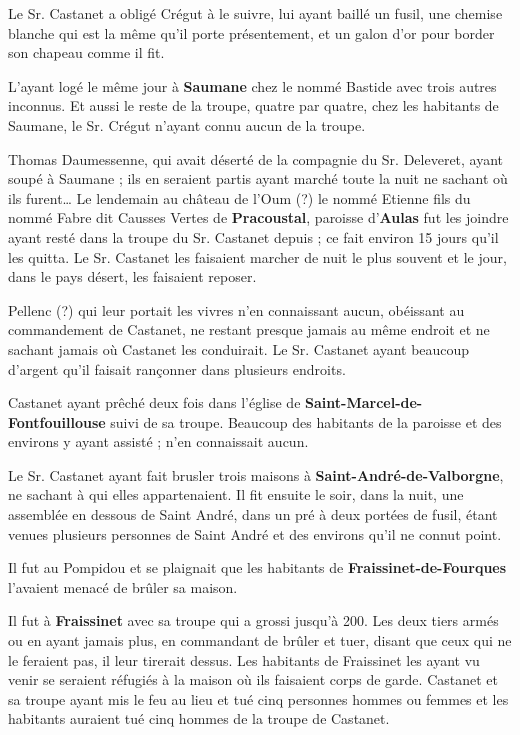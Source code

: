 Le Sr. Castanet a obligé Crégut à le suivre, lui ayant baillé un fusil, une chemise blanche qui est la même qu’il porte présentement, et un galon d’or pour border son chapeau comme il fit.

L’ayant logé le même jour à \textbf{Saumane} chez le nommé Bastide avec trois autres inconnus. Et aussi le reste de la troupe, quatre par quatre, chez les habitants de Saumane, le Sr. Crégut n’ayant connu aucun de la troupe.

Thomas Daumessenne, qui avait déserté de la compagnie du Sr. Deleveret, ayant soupé à Saumane ; ils en seraient partis ayant marché toute la nuit ne sachant où ils furent… Le lendemain au château de l’Oum (?) le nommé Etienne fils du nommé Fabre dit Causses Vertes de \textbf{Pracoustal}, paroisse d’\textbf{Aulas} fut les joindre ayant resté dans la troupe du Sr. Castanet depuis ; ce fait environ 15 jours qu’il les quitta. Le Sr. Castanet les faisaient marcher de nuit le plus souvent et le jour, dans le pays désert, les faisaient reposer.

Pellenc (?) qui leur portait les vivres n’en connaissant aucun, obéissant au commandement de Castanet, ne restant presque jamais au même endroit et ne sachant jamais où Castanet les conduirait. Le Sr. Castanet ayant beaucoup d’argent qu’il faisait rançonner dans plusieurs endroits.

Castanet ayant prêché deux fois dans l’église de \textbf{Saint-Marcel-de-Fontfouillouse} suivi de sa troupe. Beaucoup des habitants de la paroisse et des environs y ayant assisté ; n’en connaissait aucun.

Le Sr. Castanet ayant fait brusler trois maisons à \textbf{Saint-André-de-Valborgne}, ne sachant à qui elles appartenaient. Il fit ensuite le soir, dans la nuit, une assemblée en dessous de Saint André, dans un pré à deux portées de fusil, étant venues plusieurs personnes de Saint André et des environs qu’il ne connut point.

Il fut au Pompidou et se plaignait que les habitants de \textbf{Fraissinet-de-Fourques} l’avaient menacé de brûler sa maison.

Il fut à \textbf{Fraissinet} avec sa troupe qui a grossi jusqu’à 200. Les deux tiers armés ou en ayant jamais plus, en commandant de brûler et tuer, disant que ceux qui ne le feraient pas, il leur tirerait dessus. Les habitants de Fraissinet les ayant vu venir se seraient réfugiés à la maison où ils faisaient corps de garde. Castanet et sa troupe ayant mis le feu au lieu et tué cinq personnes hommes ou femmes et les habitants auraient tué cinq hommes de la troupe de Castanet.

